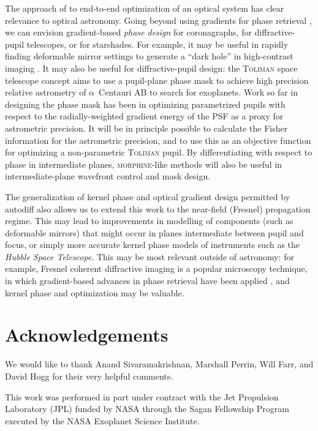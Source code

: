 \documentclass[modern]{aastex63}
\begin{document}
The approach of \citet{sitzmann2018} to end-to-end optimization of an optical system has clear relevance to optical astronomy. Going beyond using gradients for phase retrieval \citep{jurling14}, we can envision gradient-based \textit{phase design} for coronagraphs,  for diffractive-pupil telescopes, or for starshades. For example, it may be useful in rapidly finding deformable mirror settings to generate a ``dark hole'' in high-contrast imaging \citep{malbet95}. It may also be useful for diffractive-pupil design: the \textsc{Toliman} space telescope concept \citep{tuthill18,bendek18} aims to use a pupil-plane phase mask to achieve high precision relative astrometry of $\alpha$~Centauri AB to search for exoplanets. Work so far in designing the phase mask has been in optimizing parametrized pupils with respect to the radially-weighted gradient energy of the PSF as a proxy for astrometric precision. It will be in principle possible to calculate the Fisher information for the astrometric precision, and to use this as an objective function for optimizing a non-parametric \textsc{Toliman} pupil. By differentiating with respect to phase in intermediate planes, \textsc{morphine}-like methods will also be useful in intermediate-plane wavefront control and mask design.

The generalization of kernel phase and optical gradient design permitted by autodiff also allows us to extend this work to the near-field (Fresnel) propagation regime. This may lead to improvements in modelling of components (such as deformable mirrors) that might occur in planes intermediate between pupil and focus, or simply more accurate kernel phase models of instruments such as the \textit{Hubble Space Telescope}. This may be most relevant outside of astronomy: for example, Fresnel coherent diffractive imaging \citep{williams2006} is a popular microscopy technique, in which gradient-based advances in phase retrieval have been applied \citep{Dueaay3700}, and kernel phase and optimization may be valuable.

\section*{Acknowledgements} %

We would like to thank Anand Sivaramakrishnan, Marshall Perrin, Will Farr, and David Hogg for their very helpful comments.

This work was performed in part under contract with the Jet Propulsion Laboratory (JPL) funded by NASA through the Sagan Fellowship Program executed by the NASA Exoplanet Science Institute. 
\end{document}

